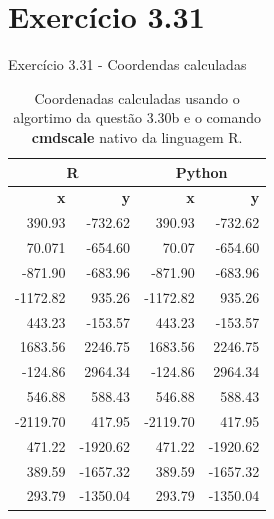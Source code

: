 \documentclass{beamer}
\begin{document}
\section{Exerc\'icio 3.31}
\begin{frame}{Exerc\'icio 3.31 - Coordendas calculadas}
  \begin{table}[]
    \centering
    \caption{Coordenadas calculadas usando o algortimo da questão 3.30b e o comando \textbf{cmdscale} nativo da linguagem R.}
    \begin{tabular}{rr|rr}
      \multicolumn{2}{c|}{\textbf{R}}       & \multicolumn{2}{c}{\textbf{Python}} \\ \hline
      \textbf{x}          & \textbf{y}        & \textbf{x}       & \textbf{y}       \\ \hline
      390.93   & -732.62  & 390.93     & -732.62    \\
      70.071   & -654.60  & 70.07      & -654.60    \\
      -871.90  & -683.96  & -871.90    & -683.96    \\
      -1172.82 & 935.26   & -1172.82   & 935.26     \\
      443.23   & -153.57  & 443.23     & -153.57    \\
      1683.56  & 2246.75  & 1683.56    & 2246.75    \\
      -124.86  & 2964.34  & -124.86    & 2964.34    \\
      546.88   & 588.43   & 546.88     & 588.43     \\
      -2119.70 & 417.95   & -2119.70   & 417.95     \\
      471.22   & -1920.62 & 471.22     & -1920.62   \\
      389.59   & -1657.32 & 389.59     & -1657.32   \\
      293.79   & -1350.04 & 293.79     & -1350.04  
    \end{tabular}
  \end{table}
\end{frame}
\end{document}
